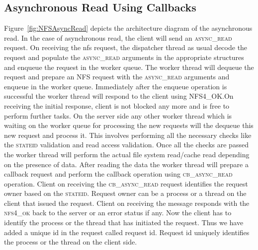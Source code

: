 \subsection{Asynchronous Read Using Callbacks}

Figure~\ref{fig:NFSAsyncRead} depicts the architecture diagram of the asynchronous read. 
In the case of asynchronous read, the client will send an \textsc{async\_read} request. On receiving the nfs request, the dispatcher thread as usual decode the request and populate the \textsc{async\_read} arguments in the appropriate structures and enqueue the request in the worker queue. The worker thread will dequeue the request and prepare an NFS request with the \textsc{async\_read} arguments and enqueue in the worker queue. Immediately after the enqueue operation is successful the worker thread will respond to the client using \textsc{NFS4\_OK}.On receiving the initial response, client is not blocked any more and is free to perform further tasks. On the server side any other worker thread which is waiting on the worker queue for processing the new requests will the dequeue this new request and process it. This involves performing all the necessary checks like the \textsc{stateid} validation and read access validation. Once all the checks are passed the worker thread will perform the actual file system read/cache read depending on the presence of data. After reading the data the worker thread will prepare a callback request and perform the callback operation using \textsc{cb\_async\_read} operation. Client on receiving the \textsc{cb\_async\_read} request identifies the request owner based on the \textsc{stateid}. Request owner can  be a process or a thread on the client that issued the request. Client on receiving the message responds with the \textsc{nfs4\_ok} back to the server or an error status if any. Now the client has to identify the process or the thread that has initiated the request. Thus we have added a unique id in the request called request id.  Request id uniquely identifies the process or the thread on the client side.   


